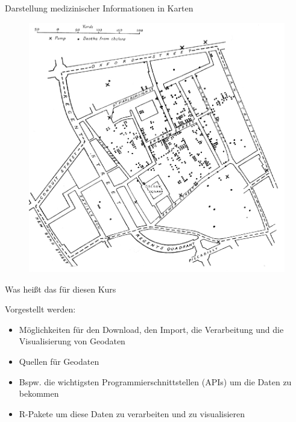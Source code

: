 \documentclass[ignorenonframetext,]{beamer}
\providecommand{\tightlist}{%
  \setlength{\itemsep}{0pt}\setlength{\parskip}{0pt}}
\begin{document}
\begin{frame}{Darstellung medizinischer Informationen in Karten}

\begin{figure}
\centering
\includegraphics{figure/Snow-cholera-map.jpg}
\caption{}
\end{figure}

\end{frame}

\begin{frame}{Was heißt das für diesen Kurs}

\begin{block}{Vorgestellt werden:}

\begin{itemize}
\tightlist
\item
  Möglichkeiten für den Download, den Import, die Verarbeitung und die
  Visualisierung von Geodaten
\end{itemize}

\begin{itemize}
\item
  Quellen für Geodaten
\item
  Bspw. die wichtigsten Programmierschnittstellen (APIs) um die Daten zu
  bekommen
\item
  R-Pakete um diese Daten zu verarbeiten und zu visualisieren
\end{itemize}

\end{block}

\end{frame}
\end{document}
